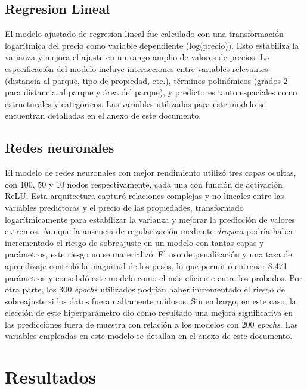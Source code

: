 \documentclass[a4paper]{article}
\theoremstyle{remark}
\theoremstyle{definition}
\begin{document}
\subsection{Regresion Lineal}

El modelo ajustado de regresion lineal fue calculado con una transformación logarítmica del precio como variable dependiente (log(precio)). Esto estabiliza la varianza y mejora el ajuste en un rango amplio de valores de precios. La especificación del modelo incluye interacciones entre variables relevantes (distancia al parque, tipo de propiedad, etc.), términos polinómicos (grados 2 para distancia al parque y área del parque), y predictores tanto espaciales como estructurales y categóricos. Las variables utilizadas para este modelo se encuentran detalladas en el anexo de este documento.


\subsection{Redes neuronales}


El modelo de redes neuronales con mejor rendimiento utilizó tres capas ocultas, con 100, 50 y 10 nodos respectivamente, cada una con función de activación ReLU. Esta arquitectura capturó relaciones complejas y no lineales entre las variables predictoras y el precio de las propiedades, transformado logarítmicamente para estabilizar la varianza y mejorar la predicción de valores extremos. Aunque la ausencia de regularización mediante \textit{dropout} podría haber incrementado el riesgo de sobreajuste en un modelo con tantas capas y parámetros, este riesgo no se materializó. El uso de penalización y una tasa de aprendizaje controló la magnitud de los pesos, lo que permitió entrenar 8.471 parámetros y consolidó este modelo como el más eficiente entre los probados. Por otra parte, los 300 \textit{epochs} utilizados podrían haber incrementado el riesgo de sobreajuste si los datos fueran altamente ruidosos. Sin embargo, en este caso, la elección de este hiperparámetro dio como resultado una mejora significativa en las predicciones fuera de muestra con relación a los modelos con 200 \textit{epochs}. Las variables empleadas en este modelo se detallan en el anexo de este documento.







\section{Resultados}
\end{document}
